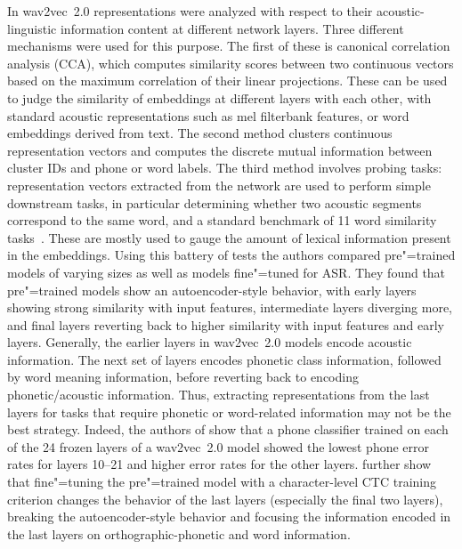In \parencite{pasad_layerwise_2021} wav2vec~2.0 representations were analyzed with
respect to their acoustic-linguistic information content at different
network layers. Three different mechanisms were used for this
purpose. The first of these is canonical correlation analysis (CCA),
which computes similarity scores between two continuous vectors
based on the maximum correlation of their linear projections.  These
can be used to judge the similarity of embeddings at different layers
with each other, with standard acoustic representations such as mel
filterbank features, or word embeddings derived from text. The second
method clusters continuous representation vectors and computes the
discrete mutual information between cluster IDs and phone or word
labels. The third method involves probing tasks: representation
vectors extracted from the network are used to perform simple
downstream tasks, in particular determining whether two acoustic segments
correspond to the same word, and a standard benchmark of 11 word
similarity tasks~\parencite{faruqi_community_2014}. These are mostly used to gauge the
amount of lexical information present in the embeddings.  Using this
battery of tests the authors compared pre"=trained models of varying
sizes as well as models fine"=tuned for ASR. They found that pre"=trained
models show an autoencoder-style behavior, with early layers showing
strong similarity with input features, intermediate layers diverging
more, and final layers reverting back to higher similarity with input
features and early layers. Generally, the earlier layers in wav2vec~2.0 
models encode acoustic information. The next set of layers encodes
phonetic class information, followed by word meaning information,
before reverting back to encoding phonetic/acoustic information. Thus,
extracting representations from the last layers for tasks that require
phonetic or word-related information may not be the best
strategy. Indeed, the authors of \parencite{baevski_unsupervised_2021} show that a
phone classifier trained on each of the 24 frozen layers of a wav2vec~2.0 model
showed the lowest phone error rates
for layers 10--21 and higher error rates for the other layers. 
\parencite{pasad_layerwise_2021} further show that fine"=tuning the pre"=trained model with a
character-level CTC training criterion changes the behavior of the
last layers (especially the final two layers), breaking the
autoencoder-style behavior and focusing the information encoded in the
last layers on orthographic-phonetic and word information. 

